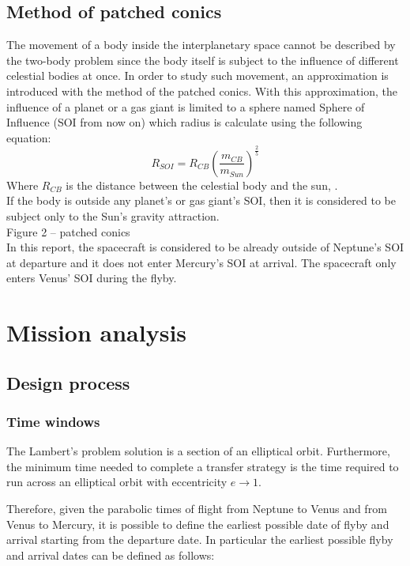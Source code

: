 \documentclass[11pt,a4paper]{report}
\begin{document}
\section{Method of patched conics}
The movement of a body inside the interplanetary space cannot be described by the two-body problem since the body itself is subject to the influence of different celestial bodies at once.
In order to study such movement, an approximation is introduced with the method of the patched conics. With this approximation, the influence of a planet or a gas giant is limited to a sphere named Sphere of Influence (SOI from now on) which radius is calculate using the following equation:
\begin{equation*}
    R_{SOI} = R_{CB}\left(\frac{m_{CB}}{m_{Sun}}\right)^{\frac{2}{5}}
\end{equation*}
Where $R_{CB}$ is the distance between the celestial body and the sun, .\\ 
If the body is outside any planet’s or gas giant’s SOI, then it is considered to be subject only to the Sun’s gravity attraction.\\
Figure 2 – patched conics\\
In this report, the spacecraft is considered to be already outside of Neptune’s SOI at departure and it does not enter Mercury’s SOI at arrival. The spacecraft only enters Venus’ SOI during the flyby.

\chapter{Mission analysis}

\section{Design process}
\subsection{Time windows}
The Lambert’s problem solution is a section of an elliptical orbit. Furthermore, the minimum time needed to complete a transfer strategy is the time required to run across an elliptical orbit with eccentricity $e\rightarrow1$.

Therefore, given the parabolic times of flight from Neptune to Venus and from Venus to Mercury, it is possible to define the earliest possible date of flyby and arrival starting from the departure date. In particular the earliest possible flyby  and arrival dates can be defined as follows:
\end{document}
